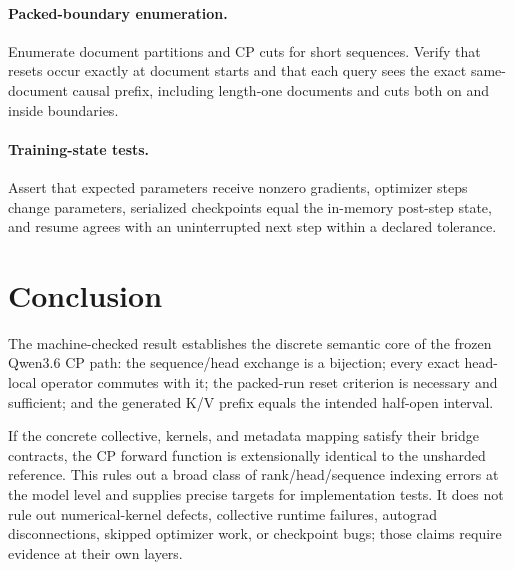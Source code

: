 \documentclass[11pt,a4paper]{article}
\begin{document}
\paragraph{Packed-boundary enumeration.}
Enumerate document partitions and CP cuts for short sequences. Verify that resets occur exactly at document starts and that each query sees the exact same-document causal prefix, including length-one documents and cuts both on and inside boundaries.

\paragraph{Training-state tests.}
Assert that expected parameters receive nonzero gradients, optimizer steps change parameters, serialized checkpoints equal the in-memory post-step state, and resume agrees with an uninterrupted next step within a declared tolerance.

\section{Conclusion}

The machine-checked result establishes the discrete semantic core of the frozen Qwen3.6 CP path: the sequence/head exchange is a bijection; every exact head-local operator commutes with it; the packed-run reset criterion is necessary and sufficient; and the generated K/V prefix equals the intended half-open interval.

If the concrete collective, kernels, and metadata mapping satisfy their bridge contracts, the CP forward function is extensionally identical to the unsharded reference. This rules out a broad class of rank/head/sequence indexing errors at the model level and supplies precise targets for implementation tests. It does not rule out numerical-kernel defects, collective runtime failures, autograd disconnections, skipped optimizer work, or checkpoint bugs; those claims require evidence at their own layers.
\end{document}
